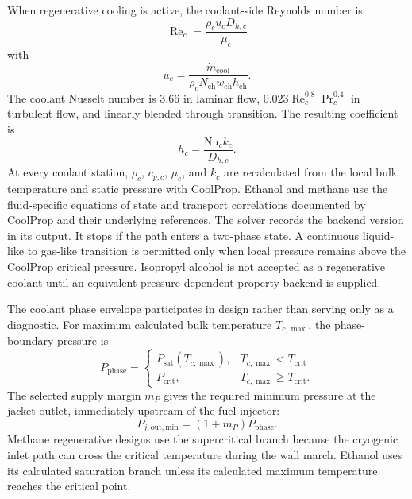 \documentclass[11pt]{article}
\newcommand{\mdot}{\dot{m}}
\newcommand{\Rey}{\operatorname{Re}}
\begin{document}
When regenerative cooling is active, the coolant-side Reynolds number is
\begin{equation}
\Rey_c=\frac{\rho_c u_c D_{h,c}}{\mu_c}
\label{eq:coolant-reynolds}
\end{equation}
with
\begin{equation}
u_c=\frac{\mdot_{\mathrm{cool}}}{\rho_c N_{\mathrm{ch}}w_{\mathrm{ch}}h_{\mathrm{ch}}}.
\label{eq:coolant-channel-velocity}
\end{equation}
The coolant Nusselt number is $3.66$ in laminar flow, $0.023\Rey_c^{0.8}\Pr_c^{0.4}$ in turbulent flow, and linearly blended through transition. The resulting coefficient is
\begin{equation}
h_c=\frac{\mathrm{Nu}_c k_c}{D_{h,c}}.
\label{eq:coolant-heat-transfer-coefficient}
\end{equation}
At every coolant station, $\rho_c$, $c_{p,c}$, $\mu_c$, and $k_c$ are recalculated from the local bulk temperature and static pressure with CoolProp. Ethanol and methane use the fluid-specific equations of state and transport correlations documented by CoolProp and their underlying references. The solver records the backend version in its output. It stops if the path enters a two-phase state. A continuous liquid-like to gas-like transition is permitted only when local pressure remains above the CoolProp critical pressure. Isopropyl alcohol is not accepted as a regenerative coolant until an equivalent pressure-dependent property backend is supplied.

The coolant phase envelope participates in design rather than serving only as a diagnostic. For maximum calculated bulk temperature $T_{c,\max}$, the phase-boundary pressure is
\begin{equation}
P_{\mathrm{phase}}=
\begin{cases}
P_{\mathrm{sat}}(T_{c,\max}), & T_{c,\max}<T_{\mathrm{crit}}\\
P_{\mathrm{crit}}, & T_{c,\max}\ge T_{\mathrm{crit}}.
\end{cases}
\label{eq:coolant-phase-boundary}
\end{equation}
The selected supply margin $m_P$ gives the required minimum pressure at the jacket outlet, immediately upstream of the fuel injector:
\begin{equation}
P_{j,\mathrm{out,min}}=(1+m_P)P_{\mathrm{phase}}.
\label{eq:coolant-phase-margin}
\end{equation}
Methane regenerative designs use the supercritical branch because the cryogenic inlet path can cross the critical temperature during the wall march. Ethanol uses its calculated saturation branch unless its calculated maximum temperature reaches the critical point.
\end{document}
